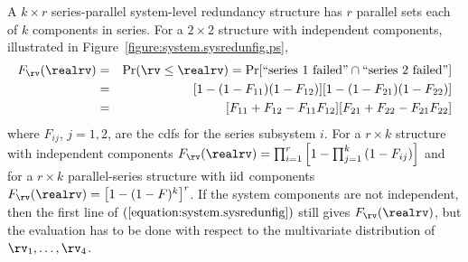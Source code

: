 A $k \times r$ series-parallel system-level redundancy structure has
$r$ parallel sets each of $k$ components in series.  For a $2 \times
2$ structure with independent components, illustrated in
Figure~\ref{figure:system.sysredunfig.ps},
\begin{eqnarray}
\label{equation:system.sysredunfig}
F_{\rv}(\realrv)&=&\Pr( \rv \le \realrv)
=\Pr [\mbox{``series 1 failed''} \cap 
\mbox{``series 2 failed''} ]
\\ \nonumber
&=&[1-(1-F_{11})(1- F_{12})][1-(1-F_{21})(1- F_{22})]
\\ \nonumber
&=& [F_{11} + F_{12} - F_{11} F_{12}   ] [F_{21} + F_{22} - F_{21} F_{22}  ] 
\end{eqnarray}
where $F_{ij}$, $j=1,2$, are the cdfs for the series
subsystem $i$.  For a $r
\times k$ structure with independent components
$F_{\rv}(\realrv)=\prod_{i=1}^{r} \left [ 1- \prod_{j=1}^{k} \left
(1-F_{ij} \right )\right ]$ and for a $r \times k$ parallel-series
structure with ${\rm iid}$ components $F_{\rv}(\realrv)=
\left [1- (1-F)^{k}\right ]^{r}$.
If the system components are not independent, then the first line of
$(\ref{equation:system.sysredunfig})$ still gives $F_{\rv}(\realrv)$, but
the evaluation has to be done with respect to the multivariate
distribution of $\rv_{1}, \dots, \rv_{4}$.

